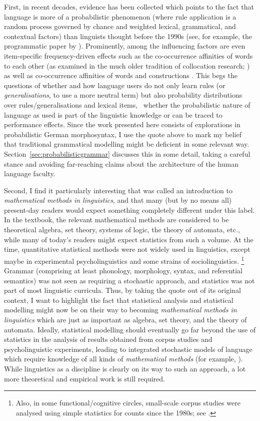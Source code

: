 \documentclass[a4paper, biblatex, charis, linguex]{glossa}
\begin{document}
First, in recent decades, evidence has been collected which points to the fact that language is more of a probabilistic phenomenon (where rule application is a random process governed by chance and weighted lexical, grammatical, and contextual factors) than linguists thought before the 1990s (see, for example, the programmatic paper by \citealt{Bresnan2007}).
Prominently, among the influencing factors are even item-specific frequency-driven effects such as the co-occurrence affinities of words to each other (as examined in the much older tradition of collocation research; \citealt{Evert2008}) as well as co-occurrence affinities of words and constructions \citep{StefanowitschGries2003,GriesStefanowitsch2004,Gries2015b}.
This begs the questions of whether and how language users do not only learn rules (or \textit{generalisations}, to use a more neutral term) but also probability distributions over rules\slash generalisations and lexical items, \ie\ whether the probabilistic nature of language as used is part of the linguistic knowledge or can be traced to performance effects.
Since the work presented here consists of explorations in probabilistic German morphosyntax, I use the quote above to mark my belief that traditional grammatical modelling might be deficient in some relevant way.
Section~\ref{sec:probabilisticgrammar} discusses this in some detail, taking a careful stance and avoiding far-reaching claims about the architecture of the human language faculty.

Second, I find it particularly interesting that \citet{ParteeEa1990} was called an introduction to \textit{mathematical methods in linguistics}, and that many (but by no means all) present-day readers would expect something completely different under this label.
In the textbook, the relevant mathematical methods are considered to be theoretical algebra, set theory, systems of logic, the theory of automata, etc., while many of today's readers might expect statistics from such a volume.
At the time, quantitative statistical methods were not widely used in linguistics, except maybe in experimental psycholinguistics and some strains of sociolinguistics.%
\footnote{Also, in some functional\slash cognitive circles, small-scale corpus studies were analysed using simple statistics for counts since the 1980s; see \citet[8]{Gries2017a}.}
Grammar (comprising at least phonology, morphology, syntax, and referential semantics) was not seen as requiring a stochastic approach, and statistics was not part of most linguistic curricula.
Thus, by taking the quote out of its original context, I want to highlight the fact that statistical analysis and statistical modelling might now be on their way to becoming \textit{mathematical methods in linguistics} which are just as important as algebra, set theory, and the theory of automata.
Ideally, statistical modelling should eventually go far beyond the use of statistics in the analysis of results obtained from corpus studies and psycholinguistic experiments, leading to integrated stochastic models of language which require knowledge of all kinds of \textit{mathematical methods} (for example, \citealt{Bod2006}).
While linguistics as a discipline is clearly on its way to such an approach, a lot more theoretical and empirical work is still required.
\end{document}
